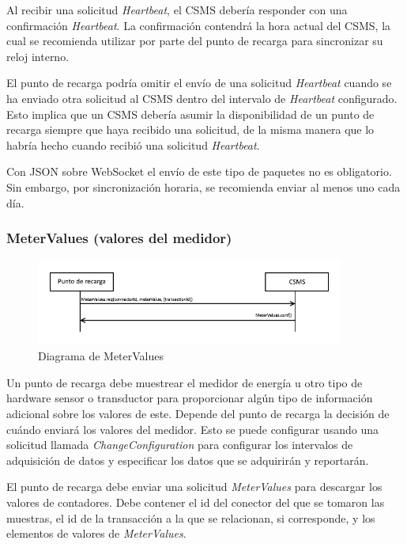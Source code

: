 \documentclass[12pt,a4paper,onecolumn,oneside]{report}
\begin{document}
Al recibir una solicitud \textit{Heartbeat}, el CSMS debería responder con una confirmación \textit{Heartbeat}. La confirmación contendrá la hora actual del CSMS, la cual se recomienda utilizar por parte del punto de recarga para sincronizar su reloj interno.

El punto de recarga podría omitir el envío de una solicitud \textit{Heartbeat} cuando se ha enviado otra solicitud al CSMS dentro del intervalo de \textit{Heartbeat} configurado. Esto implica que un CSMS debería asumir la disponibilidad de un punto de recarga siempre que haya recibido una solicitud, de la misma manera que lo habría hecho cuando recibió una solicitud \textit{Heartbeat}.

Con JSON sobre WebSocket el envío de este tipo de paquetes no es obligatorio. Sin embargo, por sincronización horaria, se recomienda enviar al menos uno cada día.


\subsubsection{MeterValues (valores del medidor)}
\label{MeterValues (valores del medidor)}


\begin{figure}[h] 
\centering
  \includegraphics[width=0.9\textwidth]{figuras/diagramametervalues.png}
  \caption[Diagrama de \textit{MeterValues}]{Diagrama de MeterValues\\
  }
  \label{fig:diagramametervalues}
\end{figure}


Un punto de recarga debe muestrear el medidor de energía u otro tipo de hardware sensor o transductor para proporcionar algún tipo de información adicional sobre los valores de este. Depende del punto de recarga la decisión de cuándo enviará los valores del medidor. Esto se puede configurar usando una solicitud llamada \textit{ChangeConfiguration} para configurar los intervalos de adquisición de datos y especificar los datos que se adquirirán y reportarán.

El punto de recarga debe enviar una solicitud \textit{MeterValues} para descargar los valores de contadores. Debe contener el id del conector del que se tomaron las muestras, el id de la transacción a la que se relacionan, si corresponde, y los elementos de valores de \textit{MeterValues}.
\end{document}

